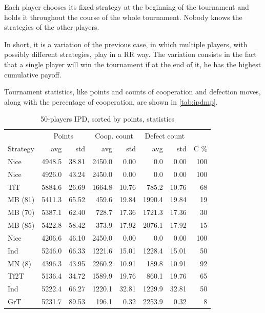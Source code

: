 \documentclass[journal,a4paper,10pt,twoside]{IEEEtran} %
\begin{document}
Each player chooses its fixed strategy at the beginning of the tournament and holds it throughout the course of the whole tournament. Nobody knows the strategies of the other players.

In short, it is a variation of the previous case, in which multiple players, with possibly different strategies, play in a RR way. The variation consists in the fact that a single player will win the tournament if at the end of it, he has the highest cumulative payoff.

Tournament statistics, like points and counts of cooperation and defection moves, along with the percentage of cooperation, are shown in \autoref{tab:ipdmp}.

\begin{table}[ht]
    \caption{50-players IPD, sorted by points, statistics}
    \label{tab:ipdmp}
    \centering
    \begin{tabular}{lrrrrrrr} \toprule
    	         & \multicolumn{2}{c}{Points} & \multicolumn{2}{c}{Coop. count} & \multicolumn{2}{c}{Defect count} & \\
    	Strategy &      avg &   std &      avg &   std &      avg &   std &   C \% \\ \midrule
    	    Nice &   4948.5 & 38.81 &   2450.0 &  0.00 &      0.0 &  0.00 &   100 \\
    	    Nice &   4926.0 & 43.24 &   2450.0 &  0.00 &      0.0 &  0.00 &   100 \\
    	     TfT &   5884.6 & 26.69 &   1664.8 & 10.76 &    785.2 & 10.76 &    68 \\
    	 MB (81) &   5411.3 & 65.52 &    459.6 & 19.84 &   1990.4 & 19.84 &    19 \\
    	 MB (70) &   5387.1 & 62.40 &    728.7 & 17.36 &   1721.3 & 17.36 &    30 \\
    	 MB (85) &   5422.8 & 58.42 &    373.9 & 17.92 &   2076.1 & 17.92 &    15 \\
    	    Nice &   4206.6 & 46.10 &   2450.0 &  0.00 &      0.0 &  0.00 &   100 \\
    	     Ind &   5246.0 & 66.33 &   1221.6 & 15.01 &   1228.4 & 15.01 &    50 \\
    	  MN (8) &   4396.3 & 43.95 &   2260.2 & 10.91 &    189.8 & 10.91 &    92 \\
    	    Tf2T &   5136.4 & 34.72 &   1589.9 & 19.76 &    860.1 & 19.76 &    65 \\
    	     Ind &   5222.4 & 66.27 &   1220.1 & 32.81 &   1229.9 & 32.81 &    50 \\
    	     GrT &   5231.7 & 89.53 &    196.1 &  0.32 &   2253.9 &  0.32 &     8 \\

\end{tabular}
\end{table}
\end{document}
